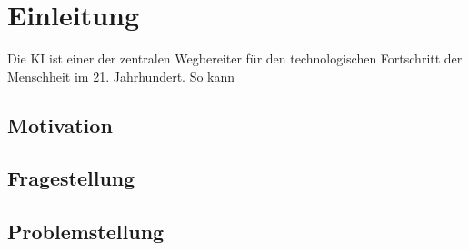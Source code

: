 \section{Einleitung}
Die \ac{KI} ist einer der zentralen Wegbereiter für den technologischen Fortschritt der Menschheit im 21. Jahrhundert.
So kann


\subsection{Motivation}


\subsection{Fragestellung}


\subsection{Problemstellung}
